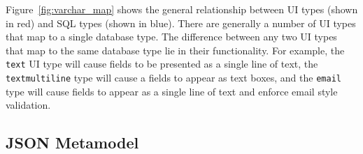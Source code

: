 Figure~\ref{fig:varchar_map} shows the general relationship between UI types
(shown in red) and SQL types (shown in blue). There are generally a number of UI
types that map to a single database type. The difference between any two UI
types that map to the same database type lie in their functionality. For
example, the \texttt{text} UI type will cause fields to be presented as a single
line of text, the \texttt{textmultiline} type will cause a fields to appear as
text boxes, and the \texttt{email} type will cause fields to appear as a single
line of text and enforce email style validation. 




\subsection{JSON Metamodel} \label{sec:json}

